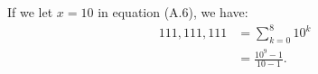 \exercise
If we let $x=10$ in equation (A.6), we have:
\begin{align*}
    111{,}111{,}111 &= \sum_{k=0}^8 10^k \\
    &= \frac{10^9-1}{10-1}.
\end{align*}

